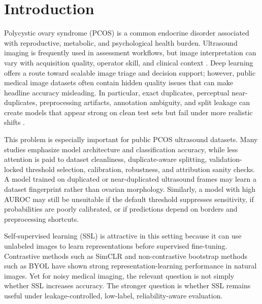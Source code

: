 \documentclass[pdflatex,sn-mathphys-num]{sn-jnl}
\theoremstyle{thmstyleone}
\theoremstyle{thmstyletwo}
\theoremstyle{thmstylethree}
\begin{document}

\maketitle

\section{Introduction}\label{sec:introduction}

Polycystic ovary syndrome (PCOS) is a common endocrine disorder associated with reproductive, metabolic, and psychological health burden. Ultrasound imaging is frequently used in assessment workflows, but image interpretation can vary with acquisition quality, operator skill, and clinical context \cite{teede2018pcos}. Deep learning offers a route toward scalable image triage and decision support; however, public medical image datasets often contain hidden quality issues that can make headline accuracy misleading. In particular, exact duplicates, perceptual near-duplicates, preprocessing artifacts, annotation ambiguity, and split leakage can create models that appear strong on clean test sets but fail under more realistic shifts \cite{degrave2021shortcut,roberts2021common}.

This problem is especially important for public PCOS ultrasound datasets. Many studies emphasize model architecture and classification accuracy, while less attention is paid to dataset cleanliness, duplicate-aware splitting, validation-locked threshold selection, calibration, robustness, and attribution sanity checks. A model trained on duplicated or near-duplicated ultrasound frames may learn a dataset fingerprint rather than ovarian morphology. Similarly, a model with high AUROC may still be unsuitable if the default threshold suppresses sensitivity, if probabilities are poorly calibrated, or if predictions depend on borders and preprocessing shortcuts.

Self-supervised learning (SSL) is attractive in this setting because it can use unlabeled images to learn representations before supervised fine-tuning. Contrastive methods such as SimCLR \cite{chen2020simclr} and non-contrastive bootstrap methods such as BYOL \cite{grill2020byol} have shown strong representation-learning performance in natural images. Yet for noisy medical imaging, the relevant question is not simply whether SSL increases accuracy. The stronger question is whether SSL remains useful under leakage-controlled, low-label, reliability-aware evaluation.
\end{document}

